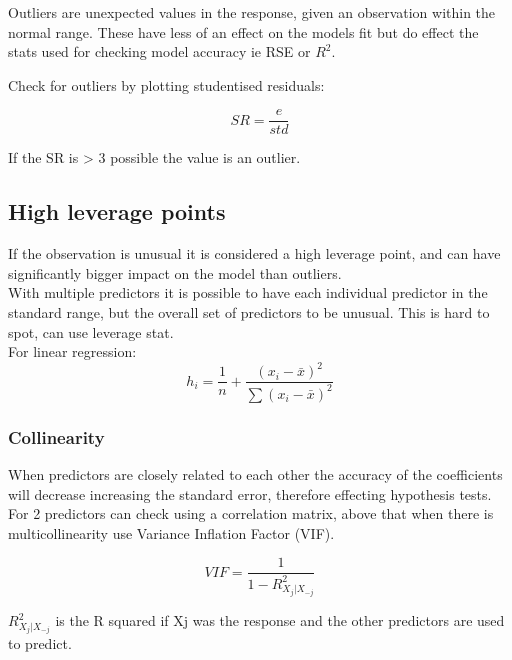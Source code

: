 \documentclass[11pt]{scrartcl} %
\begin{document}
Outliers are unexpected values in the response, given an observation within the normal range. These have less
of an effect on the models fit but do effect the stats used for checking model accuracy ie RSE or \(R^2\).

Check for outliers by plotting studentised residuals:

\begin{equation}
	SR = \frac{e}{std}	
\end{equation}

If the SR is > 3 possible the value is an outlier.

\subsection{High leverage points}

If the observation is unusual it is considered a high leverage point, and can have significantly bigger impact
on the model than outliers.\\

With multiple predictors it is possible to have each individual predictor in the standard range, but the overall set
of predictors to be unusual. This is hard to spot, can use leverage stat.\\

For linear regression:
\begin{equation}
	h_i = \frac{1}{n} + \frac{(x_i-\bar{x})^2}{\sum{(x_i-\bar{x})^2}}
\end{equation}

\subsubsection{Collinearity}

When predictors are closely related to each other the accuracy of the coefficients will decrease increasing
the standard error, therefore effecting hypothesis tests.\\

For 2 predictors can check using a correlation matrix, above that when there is multicollinearity use 
Variance Inflation Factor (VIF).

\begin{equation}
	VIF = \frac{1}{1 - R^2_{X_j|X_{-j}}}
\end{equation}

\(R^2_{X_j|X_{-j}}\) is the R squared if Xj was the response and the other predictors are used to predict.\\
\end{document}
